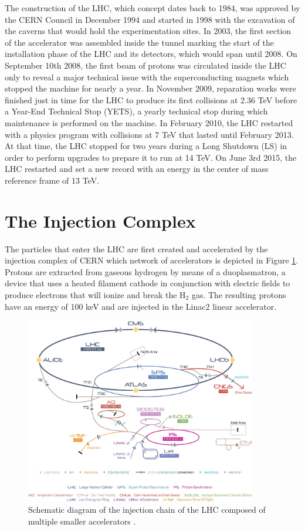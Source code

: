   The construction of the LHC, which concept dates back to 1984, was approved by the CERN Council in December 1994 and started in 1998 with the excavation of the caverns that would hold the experimentation sites. In 2003, the first section of the accelerator was assembled inside the tunnel marking the start of the installation phase of the LHC and its detectors, which would span until 2008. On September 10th 2008, the first beam of protons was circulated inside the LHC only to reveal a major technical issue with the superconducting magnets which stopped the machine for nearly a year. In November 2009, reparation works were finished just in time for the LHC to produce its first collisions at 2.36 TeV before a Year-End Technical Stop (YETS), a yearly technical stop during which maintenance is performed on the machine. In February 2010, the LHC restarted with a physics program with collisions at 7 TeV that lasted until February 2013. At that time, the LHC stopped for two years during a Long Shutdown (LS) in order to perform upgrades to prepare it to run at 14 TeV. On June 3rd 2015, the LHC restarted and set a new record with an energy in the center of mass reference frame of 13 TeV.

  \section{The Injection Complex}

    The particles that enter the LHC are first created and accelerated by the injection complex of CERN which network of accelerators is depicted in Figure \ref{fig:I-2-injection-chain}. Protons are extracted from gaseous hydrogen by means of a duoplasmatron, a device that uses a heated filament cathode in conjunction with electric fields to produce electrons that will ionize and break the H$_2$ gas. The resulting protons have an energy of 100 keV and are injected in the Linac2 linear accelerator. \\

		\begin{figure}[h!]
			\centering
			\includegraphics[width=0.9\textwidth]{img/I-2-LHC/injectors.png}
			\caption{Schematic diagram of the injection chain of the LHC composed of multiple smaller accelerators \Cite{TE-EPC-LPC}.}
			\label{fig:I-2-injection-chain}
		\end{figure}

